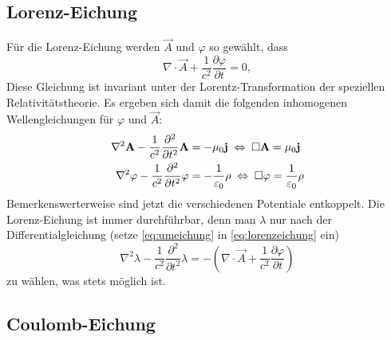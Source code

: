 \subsection{Lorenz-Eichung}

Für die Lorenz-Eichung werden $\vec {A}$ und $\varphi $ so gewählt, dass
\begin{equation}
	\label{eq:lorenzeichung}
	\nabla \cdot \vec {A}+\frac{1}{c^{2}}\frac{\partial \varphi }{\partial t}=0,
\end{equation}
Diese Gleichung ist invariant unter der Lorentz-Transformation der speziellen Relativitätstheorie. Es ergeben sich damit die folgenden inhomogenen Wellengleichungen für $\varphi $ und $\vec {A}$:
\begin{align*}
	\nabla ^{2}\mathbf{A}-\frac{1}{c^{2}}\frac{\partial ^{2}}{\partial t^{2}}\mathbf{A} & =-\mu _{0}\mathbf{j}\;\Leftrightarrow\; \Box \mathbf{A}=\mu _{0}\mathbf{j}                              \\
	\nabla ^{2}\varphi -\frac{1}{c^{2}}\frac{\partial ^{2}}{\partial t^{2}}\varphi  & =-\frac{1}{\varepsilon _{0}}\rho \;\Leftrightarrow\; \Box \varphi =\frac{1}{\varepsilon _{0}}\rho
\end{align*}
Bemerkenswerterweise sind jetzt die verschiedenen Potentiale entkoppelt. Die Lorenz-Eichung ist immer durchführbar, denn man $\lambda $ nur nach der Differentialgleichung (setze \eqref{eq:umeichung} in \eqref{eq:lorenzeichung} ein)
\begin{equation*}
	\nabla ^{2}\lambda -\frac{1}{c^{2}}\frac{\partial ^{2}}{\partial t^{2}}\lambda =-\left(\nabla \cdot \vec {A}+\frac{1}{c^{2}}\frac{\partial \varphi }{\partial t}\right)
\end{equation*}
zu wählen, was stets möglich ist.


\subsection{Coulomb-Eichung}

